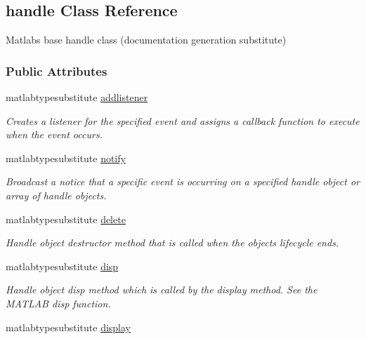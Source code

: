 \hypertarget{classhandle}{}\subsection{handle Class Reference}
\label{classhandle}


Matlab\textquotesingle{}s base handle class (documentation generation substitute)  


\subsubsection*{Public Attributes}
\begin{DoxyCompactItemize}
\item 
matlabtypesubstitute \hyperlink{classhandle_aa72d46799b8792edbf8acb7349680c15}{addlistener}
\begin{DoxyCompactList}\small\item\em Creates a listener for the specified event and assigns a callback function to execute when the event occurs. \end{DoxyCompactList}\item 
\hypertarget{classhandle_a8cfc3dab9d3ecc55b0b3449c2c7afd6f}{}matlabtypesubstitute \hyperlink{classhandle_a8cfc3dab9d3ecc55b0b3449c2c7afd6f}{notify}\label{classhandle_a8cfc3dab9d3ecc55b0b3449c2c7afd6f}

\begin{DoxyCompactList}\small\item\em Broadcast a notice that a specific event is occurring on a specified handle object or array of handle objects. \end{DoxyCompactList}\item 
\hypertarget{classhandle_a1d55d41c7af285b8fe7ab17ed5e176f6}{}matlabtypesubstitute \hyperlink{classhandle_a1d55d41c7af285b8fe7ab17ed5e176f6}{delete}\label{classhandle_a1d55d41c7af285b8fe7ab17ed5e176f6}

\begin{DoxyCompactList}\small\item\em Handle object destructor method that is called when the object\textquotesingle{}s lifecycle ends. \end{DoxyCompactList}\item 
\hypertarget{classhandle_adedb524cfbdf6a5d946cc57ef6745099}{}matlabtypesubstitute \hyperlink{classhandle_adedb524cfbdf6a5d946cc57ef6745099}{disp}\label{classhandle_adedb524cfbdf6a5d946cc57ef6745099}

\begin{DoxyCompactList}\small\item\em Handle object disp method which is called by the display method. See the M\+A\+T\+L\+A\+B disp function. \end{DoxyCompactList}\item 
\hypertarget{classhandle_a2e26be32e99b2b98db18bb538638b814}{}matlabtypesubstitute \hyperlink{classhandle_a2e26be32e99b2b98db18bb538638b814}{display}\label{classhandle_a2e26be32e99b2b98db18bb538638b814}


\end{DoxyCompactItemize}
